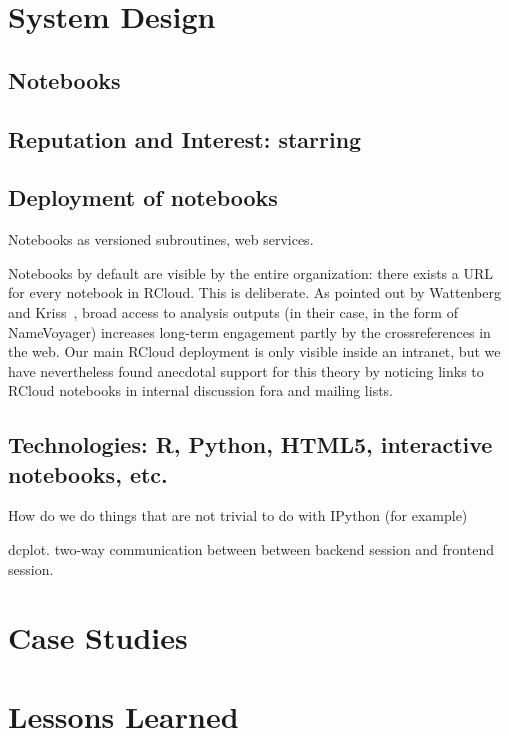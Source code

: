 \documentclass[review,journal]{vgtc}         %
\begin{document}
\section{System Design}

\subsection{Notebooks\label{sec:notebooks}}

\subsection{Reputation and Interest: starring\label{sec:starring}}

\subsection{Deployment of notebooks\label{sec:deployment}}

Notebooks as versioned subroutines, web services.

Notebooks by default are visible by the entire organization: there
exists a URL for every notebook in RCloud. This is deliberate. As
pointed out by Wattenberg and Kriss~\cite{Wattenberg:2011:DFS}, broad
access to analysis outputs (in their case, in the form of NameVoyager)
increases long-term engagement partly by the crossreferences in the
web. Our main RCloud deployment is only visible inside an intranet,
but we have nevertheless found anecdotal support for this theory by
noticing links to RCloud notebooks in internal discussion fora and
mailing lists.

\subsection{Technologies: R, Python, HTML5, interactive notebooks, etc.}

How do we do things that are not trivial to do with IPython (for example)

dcplot. two-way communication between between backend session and
frontend session.

\section{Case Studies}

\section{Lessons Learned}
\end{document}

